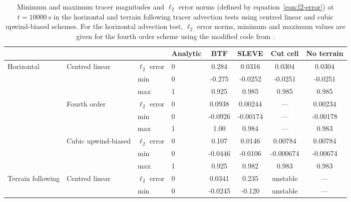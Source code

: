 \documentclass{ametsoc}
\begin{document}
\begin{table*}
	\caption{Minimum and maximum tracer magnitudes and \(\ell_2\) error norms (defined by equation~\ref{eqn:l2-error}) at \(t = \SI{10000}{\second}\) in the horizontal and terrain following tracer advection tests using centred linear and cubic upwind-biased schemes.  For the horizontal advection test, \(\ell_2\) error norms, minimum and maximum values are given for the fourth order scheme using the modified code from \citet{schaer2002}.}
\label{tab:advection}
%
\centering
\footnotesize
\begin{tabular}{l l l l S S S S}
\hline\hline
                  &                     &                  & Analytic & {BTF}   & {SLEVE}         & {Cut cell}     & {No terrain} \\
\hline
Horizontal        & Centred linear      & \(\ell_2\) error & 0        & 0.284   & 0.0316          & 0.0304         & 0.0304      \\
                  &                     & min              & 0        & -0.275  & -0.0252         & -0.0251        & -0.0251     \\
                  &                     & max              & 1        & 0.925   & 0.985           & 0.985          & 0.985       \\
                  & Fourth order        & \(\ell_2\) error & 0        & 0.0938  & 0.00244         & {---}          & 0.00234     \\
                  &                     & min              & 0        & -0.0926 & -0.00174        & {---}          & -0.00178    \\
                  &                     & max              & 1        & 1.00    & 0.984           & {---}          & 0.983       \\
                  & Cubic upwind-biased & \(\ell_2\) error & 0        & 0.107   & 0.0146          & 0.00784        & 0.00784     \\
                  &                     & min              & 0        & -0.0446 & -0.0106         & -0.000674      & -0.00674    \\
                  &                     & max              & 1        & 0.925   & 0.982           & 0.983          & 0.983       \\
\hline
Terrain following & Centred linear      & \(\ell_2\) error & 0        & 0.0341  & 0.235           & {unstable}     & {---}        \\
	          &                     & min              & 0        & -0.0245 & -0.120          & {unstable}     & {---}        \\

\end{tabular}
\end{table*}
\end{document}
